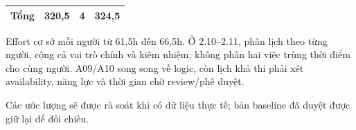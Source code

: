 \documentclass{article}
\begin{document}
\begin{landscape}
\begin{table}[H]
\begin{tabularx}{\linewidth}{|p{3.8cm}|X|X|X|}
\textbf{Tổng} & \textbf{320,5} & \textbf{4} & \textbf{324,5} \\ \hline
\end{tabularx}
\end{table}
\noindent Effort cơ sở mỗi người từ 61,5h đến 66,5h. Ở 2.10--2.11, phân lịch theo từng người, cộng cả vai trò chính và kiêm nhiệm; không phân hai việc trùng thời điểm cho cùng người. A09/A10 song song về logic, còn lịch khả thi phải xét availability, năng lực và thời gian chờ review/phê duyệt.

\medskip
\noindent Các ước lượng sẽ được rà soát khi có dữ liệu thực tế; bản baseline đã duyệt được giữ lại để đối chiếu.
\end{landscape}
\restoregeometry
\end{document}
